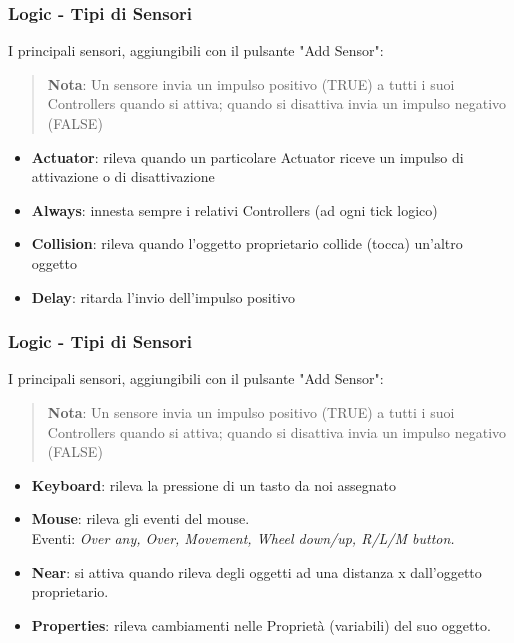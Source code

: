 \documentclass{beamer}
\begin{document}
		\begin{frame}
			\frametitle{Logic - Tipi di Sensori}
			I principali sensori, aggiungibili con il pulsante "Add Sensor":\\
			\begin{quote}
			\textcolor{BlenderOrange}{\textbf{Nota}: Un sensore invia un impulso positivo (TRUE) a tutti i suoi Controllers quando si attiva; quando si disattiva invia un impulso negativo (FALSE)}
			\end{quote}
						
			\begin{itemize}
				\item \textbf{Actuator}: rileva quando un particolare Actuator riceve un impulso di attivazione o di disattivazione
				\item \textbf{Always}: innesta sempre i relativi Controllers (ad ogni tick logico)
				\item \textbf{Collision}: rileva quando l'oggetto proprietario collide (tocca) un'altro oggetto
				\item \textbf{Delay}: ritarda l'invio dell'impulso positivo
			\end{itemize}
		\end{frame}	
		\begin{frame}
			\frametitle{Logic - Tipi di Sensori}
			I principali sensori, aggiungibili con il pulsante "Add Sensor":
			\begin{quote}
			\textcolor{BlenderOrange}{\textbf{Nota}: Un sensore invia un impulso positivo (TRUE) a tutti i suoi Controllers quando si attiva; quando si disattiva invia un impulso negativo (FALSE)}
			\end{quote}
			\begin{itemize}
				\item \textbf{Keyboard}: rileva la pressione di un tasto da noi assegnato %
				\item \textbf{Mouse}: rileva gli eventi del mouse. \\ {\footnotesize\hspace{1em}Eventi: \textit{Over any, Over, Movement, Wheel down/up, R/L/M button.}}
				\item \textbf{Near}: si attiva quando rileva degli oggetti ad una distanza x dall'oggetto proprietario.
				\item \textbf{Properties}: rileva cambiamenti nelle Proprietà (variabili) del suo oggetto.
			\end{itemize}
		\end{frame}	
		
\end{document}
